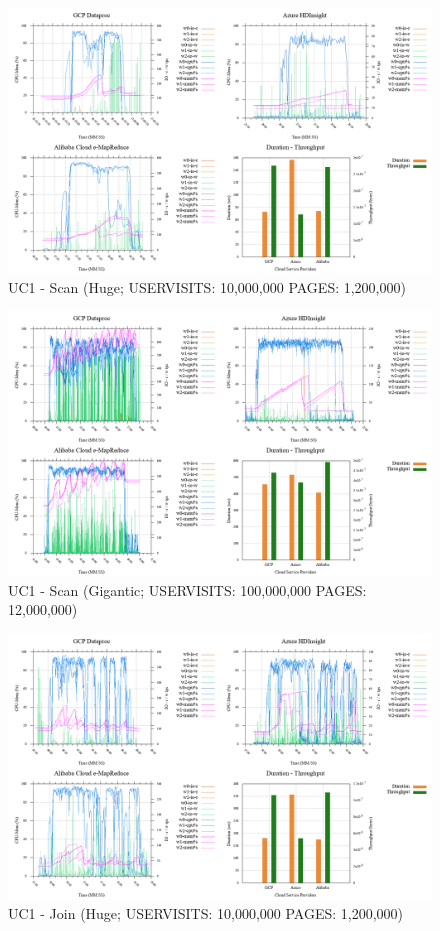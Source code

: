\documentclass[review]{elsarticle}
\begin{document}
\begin{figure}[b]
	\caption{UC1 - Scan (Huge; USERVISITS: 10,000,000 PAGES: 1,200,000)}
	\includegraphics[width=\textwidth]{uc1-scan-h-cmidt}
	\centering
\end{figure}

\begin{figure}[b]
	\caption{UC1 - Scan (Gigantic; USERVISITS: 100,000,000 PAGES: 12,000,000)}
	\includegraphics[width=\textwidth]{uc1-scan-g-cmidt}
	\centering
\end{figure}

\begin{figure}[b]
	\caption{UC1 - Join (Huge; USERVISITS: 10,000,000 PAGES: 1,200,000)}
	\includegraphics[width=\textwidth]{uc1-join-h-cmidt}
	\centering
\end{figure}
\end{document}
